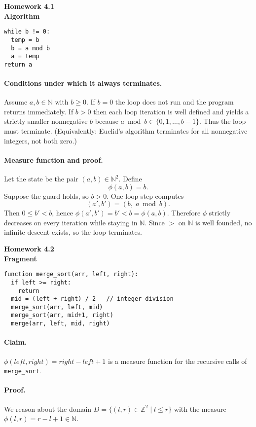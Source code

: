 \documentclass{article}
\theoremstyle{theorem}
\theoremstyle{definition}
\theoremstyle{remark}
\begin{document}
\textbf{Homework 4.1}\\
\textbf{Algorithm}
\begin{verbatim}
while b != 0:
  temp = b
  b = a mod b
  a = temp
return a
\end{verbatim}

\paragraph{Conditions under which it always terminates.}
Assume \(a,b\in\mathbb{N}\) with \(b\ge 0\). If \(b=0\) the loop does not run and the program returns immediately. If \(b>0\) then each loop iteration is well defined and yields a strictly smaller nonnegative \(b\) because \(a \bmod b\in\{0,1,\dots,b-1\}\). Thus the loop must terminate. (Equivalently: Euclid’s algorithm terminates for all nonnegative integers, not both zero.)

\paragraph{Measure function and proof.}
Let the state be the pair \((a,b)\in\mathbb{N}^2\). Define
\[
\phi(a,b)=b.
\]
Suppose the guard holds, so \(b>0\). One loop step computes
\[
(a',b')=(b,\; a\bmod b).
\]
Then \(0\le b' < b\), hence \(\phi(a',b')=b' < b=\phi(a,b)\).
Therefore \(\phi\) strictly decreases on every iteration while staying in \(\mathbb{N}\). Since \(>\) on \(\mathbb{N}\) is well founded, no infinite descent exists, so the loop terminates.

\textbf{Homework 4.2}\\
\textbf{Fragment}
\begin{verbatim}
function merge_sort(arr, left, right):
  if left >= right:
    return
  mid = (left + right) / 2   // integer division
  merge_sort(arr, left, mid)
  merge_sort(arr, mid+1, right)
  merge(arr, left, mid, right)
\end{verbatim}

\paragraph{Claim.}
\(\displaystyle \phi(left,right)=right-left+1\) is a measure function for the recursive calls of \texttt{merge\_sort}.

\paragraph{Proof.}
We reason about the domain \(D=\{(l,r)\in\mathbb{Z}^2 \mid l\le r\}\) with the measure \(\phi(l,r)=r-l+1\in\mathbb{N}\).
\end{document}
